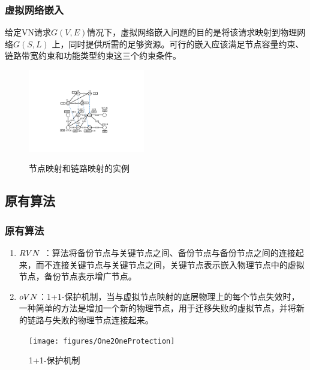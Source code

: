 \begin{frame}
\frametitle{虚拟网络嵌入}
给定VN请求$G (V,E)$情况下，虚拟网络嵌入问题的目的是将该请求映射到物理网络$G (S,L)$ 上，同时提供所需的足够资源。可行的嵌入应该满足节点容量约束、链路带宽约束和功能类型约束这三个约束条件。
\begin{figure}[htbp]
\centering
\includegraphics[width=2in]{figures/VirtualNetworkEmbedding}\\
\caption{节点映射和链路映射的实例}\label{fig:VirtualNetworkEmbedding}
\end{figure}
\end{frame}

%

\subsection{原有算法}
\begin{frame}
\frametitle{原有算法}
\begin{enumerate}
  \item $RVN$ ：算法将备份节点与关键节点之间、备份节点与备份节点之间的连接起来，而不连接关键节点与关键节点之间，关键节点表示嵌入物理节点中的虚拟节点，备份节点表示增广节点。
  \item $oVN$：1+1-保护机制，当与虚拟节点映射的底层物理上的每个节点失效时，一种简单的方法是增加一个新的物理节点，用于迁移失败的虚拟节点，并将新的链路与失败的物理节点连接起来。
\end{enumerate}
\end{frame}
\begin{frame}

\begin{figure}[htbp]
\centering
\texttt{[image: figures/One2OneProtection]}\\
\caption{1+1-保护机制}\label{fig:One2OneProtection}
\end{figure}
\end{frame}

